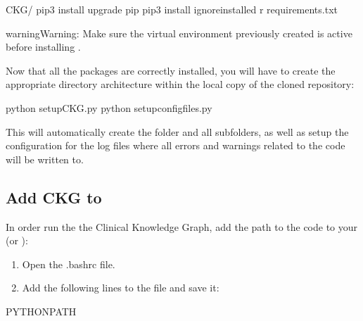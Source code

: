 \documentclass[letterpaper,10pt,english]{sphinxmanual}
\begin{document}
\begin{sphinxVerbatim}[commandchars=\\\{\}]
\PYGZdl{}  CKG/
\PYGZdl{} pip3 install \PYGZhy{}\PYGZhy{}upgrade pip
\PYGZdl{} pip3 install \PYGZhy{}\PYGZhy{}ignore\PYGZhy{}installed \PYGZhy{}r requirements.txt
\end{sphinxVerbatim}

\begin{sphinxadmonition}{warning}{Warning:}
Make sure the virtual environment previously created is active before installing .
\end{sphinxadmonition}

Now that all the packages are correctly installed, you will have to create the appropriate directory architecture within the local copy of the cloned repository:

\begin{sphinxVerbatim}[commandchars=\\\{\}]
\PYGZdl{} python setup\PYGZus{}CKG.py
\PYGZdl{} python setup\PYGZus{}config\PYGZus{}files.py
\end{sphinxVerbatim}

This will automatically create the  folder and all subfolders, as well as setup the configuration for the log files where all errors and warnings related to the code will be written to.


\subsection{Add CKG to }
\label{\detokenize{intro/getting-started-with-build:add-ckg-to-bashrc}}
In order run the the Clinical Knowledge Graph, add the path to the code to your  (or ):
\begin{enumerate}
%
\item {} 
Open the .bashrc file.

\item {} 
Add the following lines to the file and save it:

\end{enumerate}

\begin{sphinxVerbatim}[commandchars=\\\{\}]
 PYTHONPATH
\end{sphinxVerbatim}
\end{document}
